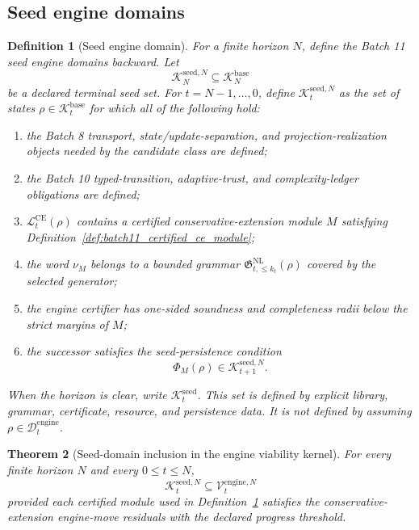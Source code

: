 \documentclass[11pt]{article}
\newtheorem{theorem}{Theorem}[section]
\newtheorem{definition}[theorem]{Definition}
\newcommand{\Lcal}{\mathcal{L}}
\newcommand{\1}{\mathbf{1}}
\providecommand{\Dcal}{\mathcal{D}}
\providecommand{\Kcal}{\mathcal{K}}
\providecommand{\Vcal}{\mathcal{V}}
\begin{document}
\subsection{Seed engine domains}

\begin{definition}[Seed engine domain]
\label{def:batch11_seed_engine_domain}
For a finite horizon \(N\), define the Batch 11 seed engine domains backward.  Let
\[
\Kcal_N^{\mathrm{seed},N}
\subseteq
\Kcal_N^{\mathrm{base}}
\]
be a declared terminal seed set.  For \(t=N-1,\ldots,0\), define \(\Kcal_t^{\mathrm{seed},N}\) as the set of states \(\rho\in\Kcal_t^{\mathrm{base}}\) for which all of the following hold:
\begin{enumerate}[label=(\roman*),leftmargin=1.5em]
    \item the Batch 8 transport, state/update-separation, and projection-realization objects needed by the candidate class are defined;
    \item the Batch 10 typed-transition, adaptive-trust, and complexity-ledger obligations are defined;
    \item \(\Lcal_t^{\mathrm{CE}}(\rho)\) contains a certified conservative-extension module \(M\) satisfying Definition~\ref{def:batch11_certified_ce_module};
    \item the word \(\nu_M\) belongs to a bounded grammar \(\mathfrak G_{t,\le k_t}^{\mathrm{NL}}(\rho)\) covered by the selected generator;
    \item the engine certifier has one-sided soundness and completeness radii below the strict margins of \(M\);
    \item the successor satisfies the seed-persistence condition
    \[
    \Phi_M(\rho)\in\Kcal_{t+1}^{\mathrm{seed},N}.
    \]
\end{enumerate}
When the horizon is clear, write \(\Kcal_t^{\mathrm{seed}}\).  This set is defined by explicit library, grammar, certificate, resource, and persistence data.  It is not defined by assuming \(\rho\in\Dcal_t^{\mathrm{engine}}\).
\end{definition}

\begin{theorem}[Seed-domain inclusion in the engine viability kernel]
\label{thm:batch11_seed_domain_in_engine_kernel}
For every finite horizon \(N\) and every \(0\le t\le N\),
\[
\Kcal_t^{\mathrm{seed},N}
\subseteq
\Vcal_t^{\mathrm{engine},N}
\]
provided each certified module used in Definition~\ref{def:batch11_seed_engine_domain} satisfies the conservative-extension engine-move residuals with the declared progress threshold.
\end{theorem}
\end{document}
